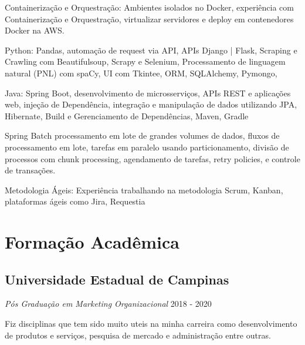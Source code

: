 \documentclass[a4paper,10pt]{article}
\begin{document}
\vspace{1.5mm}\textcolor{corSubSection}{Containerização e Orquestração:}
Ambientes isolados no Docker,
experiência com Containerização e Orquestração,
virtualizar servidores e deploy em
contenedores Docker na AWS.

\vspace{1.5mm}\textcolor{corSubSection}{Python:}
Pandas,
automação de request via API,
APIs Django | Flask,
Scraping e Crawling com Beautifulsoup,
Scrapy e Selenium,
Processamento de linguagem natural (PNL) com spaCy,
UI com Tkintee,
ORM, SQLAlchemy, Pymongo,

\vspace{1.5mm}\textcolor{corSubSection}{Java:}
Spring Boot, desenvolvimento de microsserviços, APIs REST e aplicações web,
injeção de Dependência,
integração e manipulação de dados utilizando
JPA, Hibernate,
Build e Gerenciamento de Dependências, Maven, Gradle

Spring Batch
processamento em lote de grandes volumes de dados,
fluxos de processamento em lote,
tarefas em paralelo usando particionamento,
divisão de processos com chunk processing,
agendamento de tarefas, retry policies,
e controle de transações.

\vspace{1.5mm}\textcolor{corSubSection}{Metodologia Ágeis:}
Experiência trabalhando na metodologia Scrum, Kanban, plataformas ágeis como Jira, Requestia


\clearpage
\section*{Formação Acadêmica}
\noindent\makebox[\linewidth]{\rule{\linewidth}{0.1mm}\textcolor{corLarge}{}}

\subsection*{Universidade Estadual de Campinas}
\textcolor{corSubSection}{\emph{Pós Graduação em Marketing Organizacional}}
\hfill \textcolor{corSubSection}{2018 - 2020}

Fiz disciplinas que tem sido muito uteis na minha carreira como
desenvolvimento de produtos e serviços,
pesquisa de mercado e administração entre outras.
\end{document}
